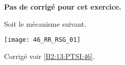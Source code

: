 \normalfalse \difficiletrue \tdifficilefalse
\correctionfalse


\setcounter{numques}{0}
\ifcorrection
\else
\textbf{Pas de corrigé pour cet exercice.}
\fi

\ifprof
\else
Soit le mécanisme suivant.
\begin{center}
\texttt{[image: 46\_RR\_RSG\_01]}
\end{center}
\fi





\ifprof
\else

\footnotesize

\normalsize


\begin{flushright}
\footnotesize{Corrigé  voir \ref{B2:13:PTSI:46}.}
\end{flushright}%
\fi